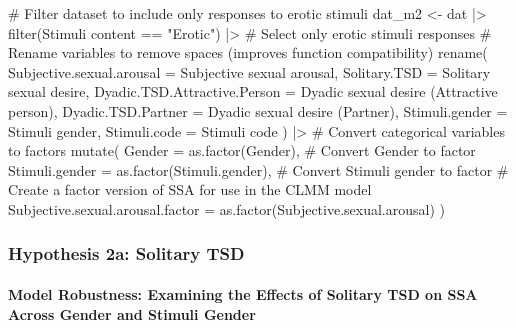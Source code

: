 \documentclass[
  bookmarksnumbered]{article}
\newenvironment{Shaded}{\begin{snugshade}}{\end{snugshade}}
\newcommand{\AttributeTok}[1]{\textcolor[rgb]{0.80,0.80,0.80}{#1}}
\newcommand{\CommentTok}[1]{\textcolor[rgb]{0.50,0.62,0.50}{#1}}
\newcommand{\FunctionTok}[1]{\textcolor[rgb]{0.94,0.94,0.56}{#1}}
\newcommand{\NormalTok}[1]{\textcolor[rgb]{0.80,0.80,0.80}{#1}}
\newcommand{\OtherTok}[1]{\textcolor[rgb]{0.94,0.94,0.56}{#1}}
\newcommand{\SpecialCharTok}[1]{\textcolor[rgb]{0.86,0.64,0.64}{#1}}
\newcommand{\StringTok}[1]{\textcolor[rgb]{0.80,0.58,0.58}{#1}}
\begin{document}
\begin{Shaded}
\begin{Highlighting}[]
\CommentTok{\# Filter dataset to include only responses to erotic stimuli}
\NormalTok{dat\_m2 }\OtherTok{\textless{}{-}}\NormalTok{ dat }\SpecialCharTok{|\textgreater{}}
  \FunctionTok{filter}\NormalTok{(}\StringTok{\textasciigrave{}}\AttributeTok{Stimuli content}\StringTok{\textasciigrave{}} \SpecialCharTok{==} \StringTok{"Erotic"}\NormalTok{) }\SpecialCharTok{|\textgreater{}} \CommentTok{\# Select only erotic stimuli responses}
  \CommentTok{\# Rename variables to remove spaces (improves function compatibility)}
  \FunctionTok{rename}\NormalTok{(}
    \AttributeTok{Subjective.sexual.arousal =} \StringTok{\textasciigrave{}}\AttributeTok{Subjective sexual arousal}\StringTok{\textasciigrave{}}\NormalTok{,}
    \AttributeTok{Solitary.TSD =} \StringTok{\textasciigrave{}}\AttributeTok{Solitary sexual desire}\StringTok{\textasciigrave{}}\NormalTok{,}
    \AttributeTok{Dyadic.TSD.Attractive.Person =} \StringTok{\textasciigrave{}}\AttributeTok{Dyadic sexual desire (Attractive person)}\StringTok{\textasciigrave{}}\NormalTok{,}
    \AttributeTok{Dyadic.TSD.Partner =} \StringTok{\textasciigrave{}}\AttributeTok{Dyadic sexual desire (Partner)}\StringTok{\textasciigrave{}}\NormalTok{,}
    \AttributeTok{Stimuli.gender =} \StringTok{\textasciigrave{}}\AttributeTok{Stimuli gender}\StringTok{\textasciigrave{}}\NormalTok{,}
    \AttributeTok{Stimuli.code =} \StringTok{\textasciigrave{}}\AttributeTok{Stimuli code}\StringTok{\textasciigrave{}}
\NormalTok{  ) }\SpecialCharTok{|\textgreater{}}
  \CommentTok{\# Convert categorical variables to factors}
  \FunctionTok{mutate}\NormalTok{(}
    \AttributeTok{Gender =} \FunctionTok{as.factor}\NormalTok{(Gender), }\CommentTok{\# Convert Gender to factor}
    \AttributeTok{Stimuli.gender =} \FunctionTok{as.factor}\NormalTok{(Stimuli.gender), }\CommentTok{\# Convert Stimuli gender to factor}
    \CommentTok{\# Create a factor version of SSA for use in the CLMM model}
    \AttributeTok{Subjective.sexual.arousal.factor =} \FunctionTok{as.factor}\NormalTok{(Subjective.sexual.arousal)}
\NormalTok{  )}
\end{Highlighting}
\end{Shaded}

\subsubsection{Hypothesis 2a: Solitary TSD}\label{hyp2a}

\paragraph{Model Robustness: Examining the Effects of Solitary TSD on SSA Across Gender and Stimuli Gender}\label{model-robustness-examining-the-effects-of-solitary-tsd-on-ssa-across-gender-and-stimuli-gender}
\end{document}
